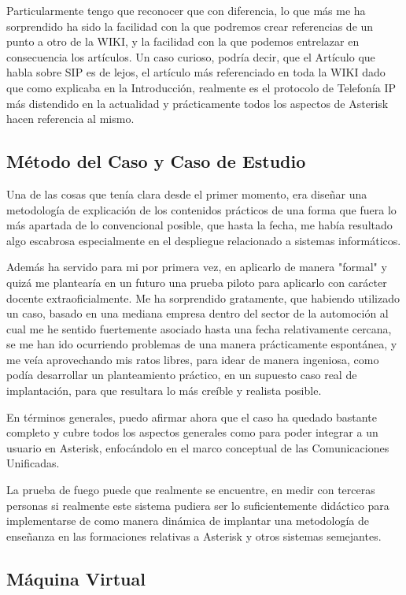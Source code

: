 Particularmente tengo que reconocer que con diferencia, lo que más me ha sorprendido ha sido la facilidad con la que podremos crear referencias de un punto a otro de la WIKI, y la facilidad con la que podemos entrelazar en consecuencia los artículos. Un caso curioso, podría decir, que el Artículo que habla sobre SIP es de lejos, el artículo más referenciado en toda la WIKI dado que como explicaba en la Introducción, realmente es el protocolo de Telefonía IP más distendido en la actualidad y prácticamente todos los aspectos de Asterisk hacen referencia al mismo.

\subsection{Método del Caso y Caso de Estudio}

Una de las cosas que tenía clara desde el primer momento, era diseñar una metodología de explicación de los contenidos prácticos de una forma que fuera lo más apartada de lo convencional posible, que hasta la fecha, me había resultado algo escabrosa especialmente en el despliegue relacionado a sistemas informáticos.

Además ha servido para mi por primera vez, en aplicarlo de manera "formal" y quizá me plantearía en un futuro una prueba piloto para aplicarlo con carácter docente extraoficialmente. Me ha sorprendido gratamente, que habiendo utilizado un caso, basado en una mediana empresa dentro del sector de la automoción al cual me he sentido fuertemente asociado hasta una fecha relativamente cercana, se me han ido ocurriendo problemas de una manera prácticamente espontánea, y me veía aprovechando mis ratos libres, para idear de manera ingeniosa, como podía desarrollar un planteamiento práctico, en un supuesto caso real de implantación, para que resultara lo más creíble y realista posible.

En términos generales, puedo afirmar ahora que el caso ha quedado bastante completo y cubre todos los aspectos generales como para poder integrar a un usuario en Asterisk, enfocándolo en el marco conceptual de las Comunicaciones Unificadas.

La prueba de fuego puede que realmente se encuentre, en medir con terceras personas si realmente este sistema pudiera ser lo suficientemente didáctico para implementarse de como manera dinámica de implantar una metodología de enseñanza en las formaciones relativas a Asterisk y otros sistemas semejantes.

\subsection{Máquina Virtual}

